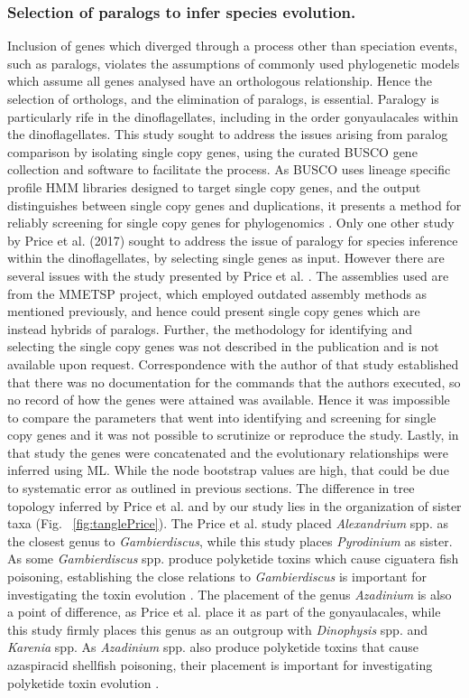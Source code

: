 \documentclass[fleqn,10pt,lineno]{wlpeerj} %
\begin{document}
\subsubsection*{Selection of paralogs to infer species evolution.}
Inclusion of genes which diverged through a process other than speciation events, such as paralogs, violates the assumptions of commonly used phylogenetic models which assume all genes analysed have an orthologous relationship.
Hence the selection of orthologs, and the elimination of paralogs, is essential.
Paralogy is particularly rife in the dinoflagellates, including in the order gonyaulacales within the dinoflagellates. 
This study sought to address the issues arising from paralog comparison by isolating single copy genes, using the curated BUSCO gene collection and software to facilitate the process. 
As BUSCO uses lineage specific profile HMM libraries designed to target single copy genes, and the output distinguishes between single copy genes and duplications, it presents a method for reliably screening for single copy genes for phylogenomics \cite{waterhouse2017busco}.
Only one other study by Price et al. (2017) sought to address the issue of paralogy for species inference within the dinoflagellates, by selecting single genes as input. 
However there are several issues with the study presented by Price et al. \cite{price2017robust}. 
The assemblies used are from the MMETSP project, which employed outdated assembly methods as mentioned previously, and hence could present single copy genes which are instead hybrids of paralogs. 
Further, the methodology for identifying and selecting the single copy genes was not described in the publication and is not available upon request. 
Correspondence with the author of that study established that there was no documentation for the commands that the authors executed, so no record of how the genes were attained was available. 
Hence it was impossible to compare the parameters that went into identifying and screening for single copy genes and it was not possible to scrutinize or reproduce the study.
Lastly, in that study the genes were concatenated and the evolutionary relationships were inferred using ML. 
While the node bootstrap values are high, that could be due to systematic error as outlined in previous sections.
The difference in tree topology inferred by Price et al. and by our study lies in the organization of sister taxa (Fig. ~\ref{fig:tanglePrice}). 
The Price et al. study placed \emph{Alexandrium} spp. as the closest genus to \emph{Gambierdiscus}, while this study places \emph{Pyrodinium} as sister. 
As some \emph{Gambierdiscus} spp. produce polyketide toxins which cause ciguatera fish poisoning, establishing the close relations to \emph{Gambierdiscus} is important for investigating the toxin evolution \cite{pawlowiez2014transcriptome}.
The placement of the genus \emph{Azadinium} is also a point of difference, as Price et al. place it as part of the gonyaulacales, while this study firmly places this genus as an outgroup with \emph{Dinophysis} spp. and \emph{Karenia} spp.
As \emph{Azadinium} spp. also produce polyketide toxins that cause azaspiracid shellfish poisoning, their placement is important for investigating polyketide toxin evolution \cite{meyer2015transcriptomic}.
 
\end{document}
